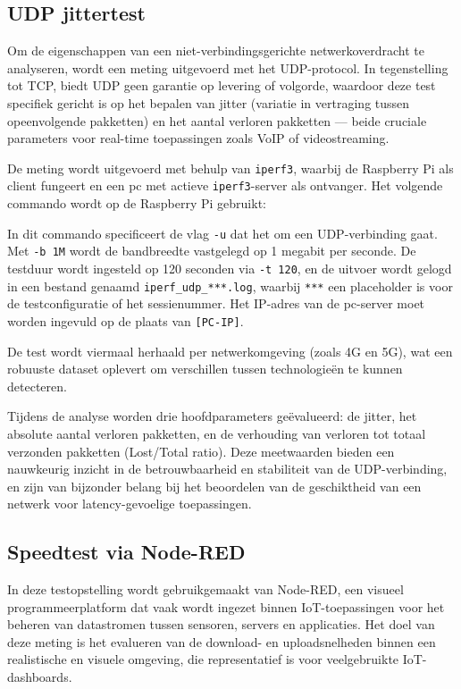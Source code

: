 \subsection{UDP jittertest}
Om de eigenschappen van een niet-verbindingsgerichte netwerkoverdracht te analyseren, wordt een meting uitgevoerd met het UDP-protocol. In tegenstelling tot TCP, biedt UDP geen garantie op levering of volgorde, waardoor deze test specifiek gericht is op het bepalen van jitter (variatie in vertraging tussen opeenvolgende pakketten) en het aantal verloren pakketten — beide cruciale parameters voor real-time toepassingen zoals VoIP of videostreaming.

De meting wordt uitgevoerd met behulp van \texttt{iperf3}, waarbij de Raspberry Pi als client fungeert en een pc met actieve \texttt{iperf3}-server als ontvanger. Het volgende commando wordt op de Raspberry Pi gebruikt:


In dit commando specificeert de vlag \texttt{-u} dat het om een UDP-verbinding gaat. Met \texttt{-b 1M} wordt de bandbreedte vastgelegd op 1 megabit per seconde. De testduur wordt ingesteld op 120 seconden via \texttt{-t 120}, en de uitvoer wordt gelogd in een bestand genaamd \texttt{iperf\_udp\_***.log}, waarbij \texttt{***} een placeholder is voor de testconfiguratie of het sessienummer. Het IP-adres van de pc-server moet worden ingevuld op de plaats van \texttt{[PC-IP]}.

De test wordt viermaal herhaald per netwerkomgeving (zoals 4G en 5G), wat een robuuste dataset oplevert om verschillen tussen technologieën te kunnen detecteren. 

Tijdens de analyse worden drie hoofdparameters geëvalueerd: de jitter, het absolute aantal verloren pakketten, en de verhouding van verloren tot totaal verzonden pakketten (Lost/Total ratio). Deze meetwaarden bieden een nauwkeurig inzicht in de betrouwbaarheid en stabiliteit van de UDP-verbinding, en zijn van bijzonder belang bij het beoordelen van de geschiktheid van een netwerk voor latency-gevoelige toepassingen.


\subsection{Speedtest via Node-RED}
In deze testopstelling wordt gebruikgemaakt van Node-RED, een visueel programmeerplatform dat vaak wordt ingezet binnen IoT-toepassingen voor het beheren van datastromen tussen sensoren, servers en applicaties. Het doel van deze meting is het evalueren van de download- en uploadsnelheden binnen een realistische en visuele omgeving, die representatief is voor veelgebruikte IoT-dashboards.

